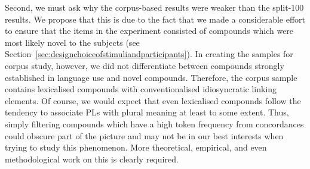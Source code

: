 Second, we must ask why the corpus-based results were weaker than the split-100 results.
We propose that this is due to the fact that we made a considerable effort to ensure that the items in the experiment consisted of compounds which were most likely novel to the subjects (see Section~\ref{sec:designchoiceofstimuliandparticipants}).
In creating the samples for corpus study, however, we did not differentiate between compounds strongly established in language use and novel compounds.
Therefore, the corpus sample contains lexicalised compounds with conventionalised idiosyncratic linking elements.
Of course, we would expect that even lexicalised compounds follow the tendency to associate PLs with plural meaning at least to some extent.
Thus, simply filtering compounds which have a high token frequency from concordances could obscure part of the picture and may not be in our best interests when trying to study this phenomenon.
More theoretical, empirical, and even methodological work on this is clearly required.

